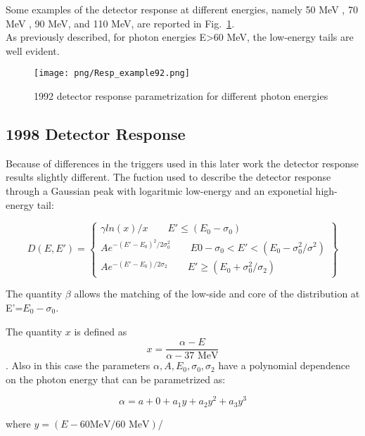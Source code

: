Some examples of the detector response at different energies, namely 50 MeV , 70 MeV , 90 MeV, and 110 MeV,
 are reported in Fig.~\ref{fig:92ResponseExample}.\\
As previously described, for photon energies E>60 MeV, the low-energy tails are well evident.

\begin{figure}[!h]
\centering
\texttt{[image: png/Resp\_example92.png]}
\caption{1992 detector response parametrization for different photon energies}
\label{fig:92ResponseExample}
\end{figure}


\subsection { 1998 Detector Response }

Because of differences in the triggers used in this later work the detector response results slightly different.
The fuction used to describe the detector response through  a Gaussian peak with logaritmic low-energy  and an exponetial high-energy tail:

\begin{equation}
  D(E,E')= \left\{
    \begin{array}{ll}
      \gamma ln(x)/x          \qquad E' \leq (E_0-\sigma_0) \\
      Ae^{-(E'-E_0)^2/2\sigma_0^2} \qquad E0-\sigma_0<E'<(E_0-\sigma_0^2/\sigma^2) \\
      Ae^{-(E'-E_0)/2\sigma_2}    \qquad E' \geq (E_0+\sigma_0^2/\sigma_2)
    \end{array}
  \right\}
\end{equation}

The quantity $\beta$  allows the matching of the low-side and core of the distribution at E'=$E_0-\sigma_0$.

The quantity $x$ is defined as 
$$x= \frac{\alpha- E}{\alpha -37 \text{ MeV}}$$.
Also in this case the parameters $\alpha,A,E_0,\sigma_0,\sigma_2$ have a polynomial dependence on the photon energy that can be parametrized as:

\begin{equation}
\alpha= a+0+a_1y+a_2y^2+a_3y^3
\end{equation}

where $y= (E-60 \text{MeV}/60 \text{ MeV})$/


